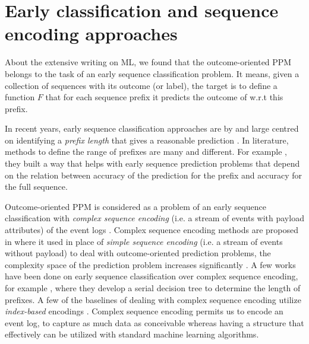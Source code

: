 \section{Early classification and sequence encoding approaches}
About the extensive writing on ML, we found that the outcome-oriented PPM belongs to the task of an early sequence classification problem. It means, given a collection of sequences with its outcome (or label), the target is to define a function $F$ that for each sequence prefix it predicts the outcome of w.r.t this prefix. 

In recent years, early sequence classification approaches are by and large centred on identifying a \textit{prefix length} that gives a reasonable prediction \cite{xing2012early}.  In literature, methods to define the range of prefixes are many and different. For example \cite{mori2017reliable}, they built a way that helps with early sequence prediction problems that depend on the relation between accuracy of the prediction for the prefix and accuracy for the full sequence.  

Outcome-oriented PPM is considered as a problem of an early sequence classification with \textit{complex sequence encoding} (i.e. a stream of events with payload attributes) of the event logs \cite{santos2016literature, xing2010brief}.  Complex sequence encoding methods are proposed in \cite{leontjeva2016complex} where it used in place of \textit{simple sequence encoding} (i.e. a stream of events without payload) to deal with outcome-oriented prediction problems, the complexity space of the prediction problem increases significantly \cite{di2017eye}. A few works have been done on early sequence classification over complex sequence encoding, for example \cite{lin2015reliable}, where they develop a serial decision tree to determine the length of prefixes. A few of the baselines of dealing with complex sequence encoding utilize \textit{index-based} encodings \cite{leontjeva2016complex}.  Complex sequence encoding permits us to encode an event log, to capture as much data as conceivable whereas having a structure that effectively can be utilized with standard machine learning algorithms.




